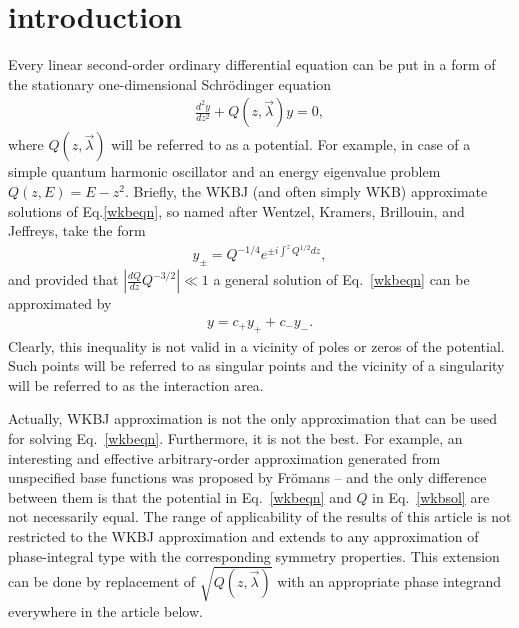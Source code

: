 \documentclass[aps,prl,preprint,superscriptaddress]{revtex4}
\begin{document}
\pacs{}

\maketitle

\section{introduction \label{INTRO}}
Every linear second-order ordinary differential equation can be put in a form of the stationary one-dimensional Schr\"odinger equation
\begin{eqnarray}
\frac{d^2y}{dz^2} + Q(z,\vec{\lambda})y = 0,   \label{wkbeqn}
\end{eqnarray}
where \mbox{$Q(z,\vec{\lambda})$} will be referred to as a potential. For example, in case of a simple quantum harmonic oscillator and an energy eigenvalue problem \mbox{$Q(z,E)=E-z^2$}. Briefly, the WKBJ (and often simply WKB) 
approximate solutions of Eq.\ref{wkbeqn}, so named after
Wentzel, Kramers, Brillouin, and Jeffreys\cite{wkbj}, take the form
\begin{eqnarray}
y_\pm = Q^{-1/4} e^{\pm i \int^z Q^{1/2} dz},   \label{wkbsol}
\end{eqnarray}
and provided that
$\left|\frac{dQ}{dz}Q^{-3/2}\right| \ll 1 $
a general solution of Eq.~\ref{wkbeqn} can be approximated by
\begin{eqnarray}
y = c_+y_+ + c_-y_-.    \label{gensol}
\end{eqnarray}
Clearly, this inequality is not valid in a vicinity of poles or zeros of the potential. Such points will be referred to as singular points and the vicinity of a singularity will be referred to as the interaction area.

Actually, WKBJ approximation is not the only approximation that can be used for solving Eq.~\ref{wkbeqn}. Furthermore, it is not the best. For example, an interesting and effective arbitrary-order approximation generated from unspecified base functions was proposed by Fr\"omans \cite{fromanA,fromanB} – and the only difference between them is that the potential in Eq.~\ref{wkbeqn} and $Q$ in
Eq.~\ref{wkbsol} are not necessarily equal. The range of applicability of the results of this article is not restricted to the WKBJ approximation and extends to any approximation of phase-integral type with the corresponding symmetry properties. This extension can be done by replacement of $\sqrt{Q(z,\vec{\lambda})}$ with an appropriate phase integrand everywhere in the article below.  
\end{document}
